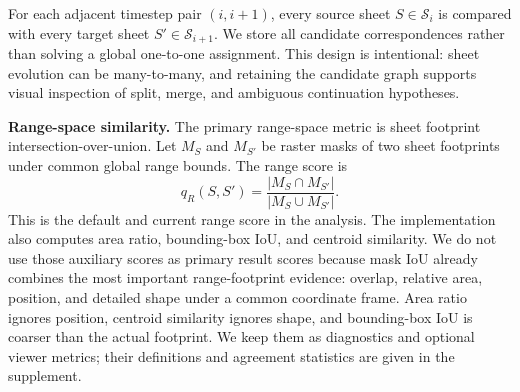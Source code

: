 \documentclass{vgtc}
\newcommand{\Sheets}{\mathcal{S}}
\newcommand{\Sheet}{S}
\newcommand{\myparagraph}[1]{\vspace{1mm} \noindent \textbf{#1}}
\begin{document}
For each adjacent timestep pair $(i,i+1)$, every source sheet $\Sheet\in\Sheets_i$ is compared with every target sheet $\Sheet'\in\Sheets_{i+1}$. We store all candidate correspondences rather than solving a global one-to-one assignment. This design is intentional: sheet evolution can be many-to-many, and retaining the candidate graph supports visual inspection of split, merge, and ambiguous continuation hypotheses.

\myparagraph{Range-space similarity.}
The primary range-space metric is sheet footprint intersection-over-union. Let $M_\Sheet$ and $M_{\Sheet'}$ be raster masks of two sheet footprints under common global range bounds. The range score is
$$
q_R(\Sheet,\Sheet') =
\frac{|M_\Sheet \cap M_{\Sheet'}|}{|M_\Sheet \cup M_{\Sheet'}|}.
$$
This is the default and current range score in the analysis. The implementation also computes area ratio, bounding-box IoU, and centroid similarity. We do not use those auxiliary scores as primary result scores because mask IoU already combines the most important range-footprint evidence: overlap, relative area, position, and detailed shape under a common coordinate frame. Area ratio ignores position, centroid similarity ignores shape, and bounding-box IoU is coarser than the actual footprint. We keep them as diagnostics and optional viewer metrics; their definitions and agreement statistics are given in the supplement.
\end{document}
